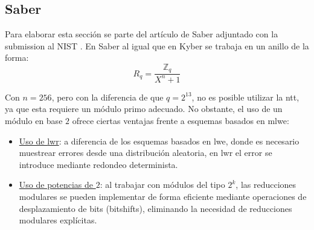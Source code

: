 \subsection{Saber}
Para elaborar esta sección se parte del artículo de Saber adjuntado con la submission al NIST \cite{saber-spec-2020}. En Saber al igual que en Kyber se trabaja en un anillo de la forma:
\begin{equation}
	R_q=\dfrac{\mathbb{Z}_q}{X^n+1}
\end{equation}

Con \(n=256\), pero con la diferencia de que \(q=2^{13}\), no es posible utilizar la \gls{ntt}, ya que esta requiere un módulo primo adecuado. No obstante, el uso de un módulo en base \(2\) ofrece ciertas ventajas \cite{modlwr} frente a esquemas basados en \gls{mlwe}:
\begin{itemize}
	\item \underline{Uso de \gls{lwr}}: a diferencia de los esquemas basados en \gls{lwe}, donde es necesario muestrear errores desde una distribución aleatoria, en \gls{lwr} el error se introduce mediante redondeo determinista.
	\item \underline{Uso de potencias de \(2\)}: al trabajar con módulos del tipo \(2^k\), las reducciones modulares se pueden implementar de forma eficiente mediante operaciones de desplazamiento de bits (bitshifts), eliminando la necesidad de reducciones modulares explícitas.
\end{itemize}

